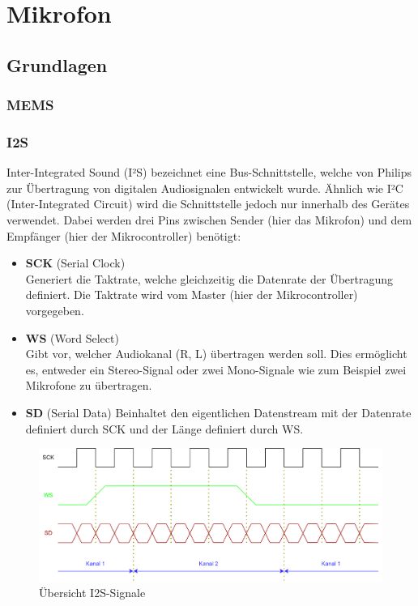 \documentclass[12pt]{article}
\begin{document}
	\newpage
	\section{Mikrofon}
	\subsection{Grundlagen}
	\subsubsection{MEMS}
	
	\subsubsection{I2S}
	Inter-Integrated Sound (I²S) bezeichnet eine Bus-Schnittstelle, welche von Philips zur Übertragung von digitalen Audiosignalen entwickelt wurde. Ähnlich wie I²C (Inter-Integrated Circuit) wird die Schnittstelle jedoch nur innerhalb des Gerätes verwendet. Dabei werden drei Pins zwischen Sender (hier das Mikrofon) und dem Empfänger (hier der Mikrocontroller) benötigt:
	\begin{itemize}
		\item \textbf{SCK} \quad (Serial Clock) \\
		Generiert die Taktrate, welche gleichzeitig die Datenrate der Übertragung definiert. Die Taktrate wird vom Master (hier der Mikrocontroller) vorgegeben.
		\item \color{green}\textbf{WS}\color{black} \quad (Word Select) \\
		Gibt vor, welcher Audiokanal (R, L) übertragen werden soll. Dies ermöglicht es, entweder ein Stereo-Signal oder zwei Mono-Signale wie zum Beispiel zwei Mikrofone zu übertragen.
		\item \color{red}\textbf{SD}\color{black} \quad (Serial Data)
		Beinhaltet den eigentlichen Datenstream mit der Datenrate definiert durch SCK und der Länge definiert durch WS.
	\end{itemize}
	\begin{figure}[H]
		\centering
		\includegraphics[width=1\linewidth]{images/BAT_I2S}
		\caption[]{Übersicht I2S-Signale}
		\label{fig:bati2s}
	\end{figure}
	
\end{document}
